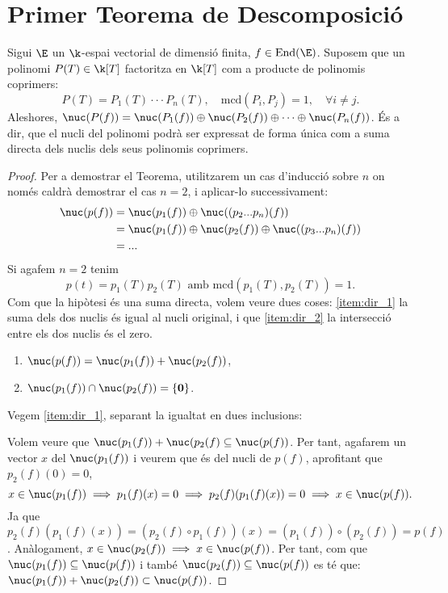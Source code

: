 \section{Primer Teorema de Descomposició}

Sigui $\E$ un $\k$-espai vectorial de dimensió finita, $f \in \text{End}(\E)$. Suposem que un polinomi $P(T) \in \k[T]$ factoritza en $\k[T]$ com a producte de polinomis coprimers:
\[P(T) = P_1(T) \cdot\cdot\cdot P_n(T), \quad \text{mcd}(P_i, P_j) = 1,\quad \forall i \neq j. \]
Aleshores, $\nuc(P(f)) = \nuc(P_1(f)) \oplus \nuc(P_2(f)) \oplus \cdots \oplus \nuc(P_n(f))$. És a dir, que el nucli del polinomi podrà ser expressat de forma única com a suma directa dels nuclis dels seus polinomis coprimers.

\begin{proof}

Per a demostrar el Teorema, utilitzarem un cas d'inducció sobre $n$ on només caldrà demostrar el cas $n = 2$, i aplicar-lo successivament:
\begin{align*}
    \nuc(p(f)) &= \nuc(p_1(f)) \oplus \nuc((p_2 ... p_n)(f)) \\
    &= \nuc(p_1(f)) \oplus \nuc(p_2(f)) \oplus \nuc((p_3 ... p_n)(f)) \\
    &= ...
\end{align*}
Si agafem $n=2$ tenim
\[ p(t) = p_1(T) p_2(T)\text{ amb mcd}(p_1(T), p_2(T)) = 1. \]
Com que la hipòtesi és una suma directa, volem veure dues coses: \eqref{item:dir_1} la suma dels dos nuclis és igual al nucli original, i que \eqref{item:dir_2} la intersecció entre els dos nuclis és el zero. 

\begin{enumerate}
    \item \label{item:dir_1}$\nuc(p(f)) = \nuc(p_1(f)) + \nuc(p_2(f))$,
    \item \label{item:dir_2}$\nuc(p_1(f)) \cap \nuc(p_2(f)) = \{\mathbf{0}\}$.
\end{enumerate}

Vegem \eqref{item:dir_1}, separant la igualtat en dues inclusions:

Volem veure que $\nuc(p_1(f))+ \nuc(p_2(f) \subseteq \nuc(p(f))$. Per tant, agafarem un vector $x$ del $\nuc(p_1(f))$ i veurem que és del nucli de $p(f)$, aprofitant que $p_2(f)(0) = 0$,
 \[
 x \in \nuc(p_1(f)) \implies p_1(f)(x) = 0 \implies p_2(f)(p_1(f)(x)) = 0 \implies x \in \nuc(p(f)).
 \]
Ja que $p_2(f)(p_1(f)(x)) = (p_2(f) \circ p_1(f))(x) = (p_1(f)) \circ (p_2(f)) = p(f)$. Anàlogament, $x \in \nuc(p_2(f)) \implies x \in \nuc(p(f))$. Per tant, com que $\nuc(p_1(f)) \subseteq \nuc(p(f))$ i també $\nuc(p_2(f)) \subseteq \nuc(p(f))$ es té que: $\nuc(p_1(f)) + \nuc(p_2(f)) \subset \nuc(p(f))$.


\end{proof}
